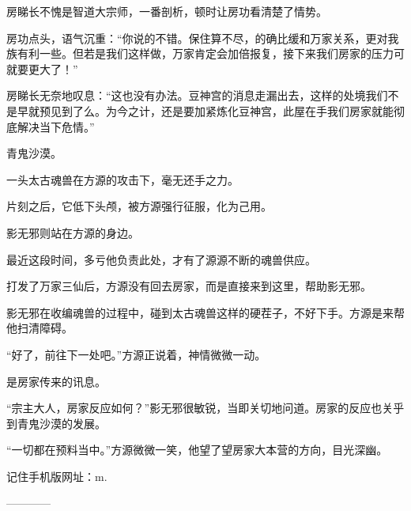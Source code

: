 \begin{this_body}
房睇长不愧是智道大宗师，一番剖析，顿时让房功看清楚了情势。

房功点头，语气沉重：“你说的不错。保住算不尽，的确比缓和万家关系，更对我族有利一些。但若是我们这样做，万家肯定会加倍报复，接下来我们房家的压力可就要更大了！”

房睇长无奈地叹息：“这也没有办法。豆神宫的消息走漏出去，这样的处境我们不是早就预见到了么。为今之计，还是要加紧炼化豆神宫，此屋在手我们房家就能彻底解决当下危情。”

青鬼沙漠。

一头太古魂兽在方源的攻击下，毫无还手之力。

片刻之后，它低下头颅，被方源强行征服，化为己用。

影无邪则站在方源的身边。

最近这段时间，多亏他负责此处，才有了源源不断的魂兽供应。

打发了万家三仙后，方源没有回去房家，而是直接来到这里，帮助影无邪。

影无邪在收编魂兽的过程中，碰到太古魂兽这样的硬茬子，不好下手。方源是来帮他扫清障碍。

“好了，前往下一处吧。”方源正说着，神情微微一动。

是房家传来的讯息。

“宗主大人，房家反应如何？”影无邪很敏锐，当即关切地问道。房家的反应也关乎到青鬼沙漠的发展。

“一切都在预料当中。”方源微微一笑，他望了望房家大本营的方向，目光深幽。

记住手机版网址：m.

------------

\end{this_body}

